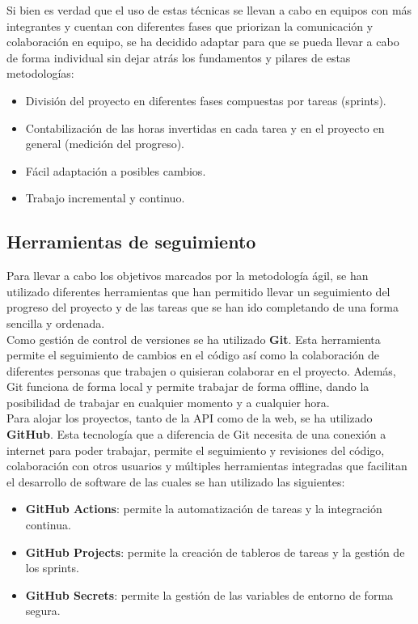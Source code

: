 Si bien es verdad que el uso de estas técnicas se llevan a cabo en equipos con más integrantes y cuentan con
diferentes fases que priorizan la comunicación y colaboración en equipo, se ha decidido adaptar para que se pueda
llevar a cabo de forma individual sin dejar atrás los fundamentos y pilares de estas metodologías:

\begin{itemize}
    \item División del proyecto en diferentes fases compuestas por tareas (sprints).
    \item Contabilización de las horas invertidas en cada tarea y en el proyecto en general (medición del progreso).
    \item Fácil adaptación a posibles cambios.
    \item Trabajo incremental y continuo.
\end{itemize}

\subsection{Herramientas de seguimiento}\label{subsec:herramientas-de-seguimiento}

Para llevar a cabo los objetivos marcados por la metodología ágil, se han utilizado diferentes herramientas que
han permitido llevar un seguimiento del progreso del proyecto y de las tareas que se han ido completando
de una forma sencilla y ordenada. \\

Como gestión de control de versiones se ha utilizado \textbf{Git}. Esta herramienta permite el seguimiento de
cambios en el código así como la colaboración de diferentes personas que trabajen o quisieran colaborar en el
proyecto. Además, Git funciona de forma local y permite trabajar de forma offline, dando la posibilidad de
trabajar en cualquier momento y a cualquier hora. \\

Para alojar los proyectos, tanto de la API como de la web, se ha utilizado \textbf{GitHub}. Esta tecnología que
a diferencia de Git necesita de una conexión a internet para poder trabajar, permite el seguimiento y revisiones del
código, colaboración con otros usuarios y múltiples herramientas integradas que facilitan el desarrollo de software de
las cuales se han utilizado las siguientes:

\begin{itemize}
    \item \textbf{GitHub Actions}: permite la automatización de tareas y la integración continua.
    \item \textbf{GitHub Projects}: permite la creación de tableros de tareas y la gestión de los sprints.
    \item \textbf{GitHub Secrets}: permite la gestión de las variables de entorno de forma segura.
\end{itemize}

